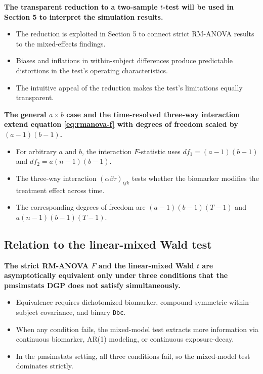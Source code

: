 \documentclass[
  11pt,
]{article}
\begin{document}
\textbf{The transparent reduction to a two-sample $t$-test will be used in Section 5 to interpret the simulation results.}

\begin{itemize}\setlength{\itemsep}{2pt}\setlength{\parskip}{0pt}
\item The reduction is exploited in Section 5 to connect strict RM-ANOVA results to the mixed-effects findings.
\item Biases and inflations in within-subject differences produce predictable distortions in the test's operating characteristics.
\item The intuitive appeal of the reduction makes the test's limitations equally transparent.
\end{itemize}

\textbf{The general $a \times b$ case and the time-resolved three-way interaction extend equation \ref{eq:rmanova-f} with degrees of freedom scaled by $(a-1)(b-1)$.}

\begin{itemize}\setlength{\itemsep}{2pt}\setlength{\parskip}{0pt}
\item For arbitrary $a$ and $b$, the interaction $F$-statistic uses $df_1 = (a-1)(b-1)$ and $df_2 = a(n-1)(b-1)$.
\item The three-way interaction $(\alpha\beta\tau)_{ijk}$ tests whether the biomarker modifies the treatment effect across time.
\item The corresponding degrees of freedom are $(a-1)(b-1)(T-1)$ and $a(n-1)(b-1)(T-1)$.
\end{itemize}

\subsection{Relation to the linear-mixed Wald test}\label{relation-to-the-linear-mixed-wald-test}

\textbf{The strict RM-ANOVA $F$ and the linear-mixed Wald $t$ are asymptotically equivalent only under three conditions that the pmsimstats DGP does not satisfy simultaneously.}

\begin{itemize}\setlength{\itemsep}{2pt}\setlength{\parskip}{0pt}
\item Equivalence requires dichotomized biomarker, compound-symmetric within-subject covariance, and binary \texttt{Dbc}.
\item When any condition fails, the mixed-model test extracts more information via continuous biomarker, AR(1) modeling, or continuous exposure-decay.
\item In the pmsimstats setting, all three conditions fail, so the mixed-model test dominates strictly.
\end{itemize}
\end{document}
